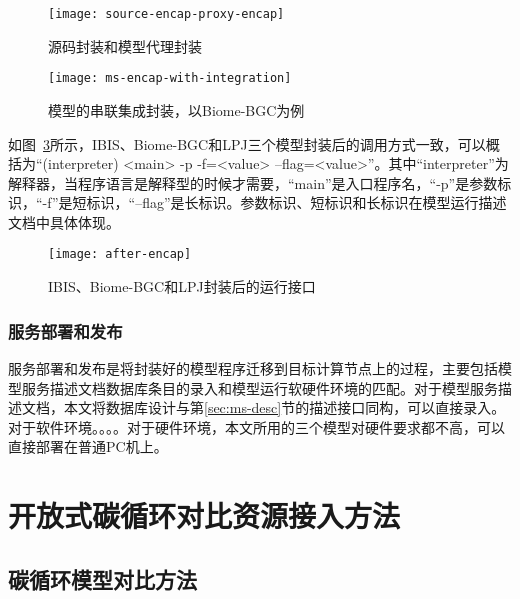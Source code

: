 \begin{figure}[!htbp]
    \centering
    \texttt{[image: source-encap-proxy-encap]}
    \caption{源码封装和模型代理封装}
    \label{fig:source-encap-proxy-encap}
\end{figure}

\begin{figure}[!htbp]
    \centering
    \texttt{[image: ms-encap-with-integration]}
    \caption{模型的串联集成封装，以Biome-BGC为例}
    \label{fig:ms-encap-with-integration}
\end{figure}

如图~\ref{fig:after-encap}所示，IBIS、Biome-BGC和LPJ三个模型封装后的调用方式一致，可以概括为“(interpreter) <main> -p -f=<value> --flag=<value>”。其中“interpreter”为解释器，当程序语言是解释型的时候才需要，“main”是入口程序名，“-p”是参数标识，“-f”是短标识，“--flag”是长标识。参数标识、短标识和长标识在模型运行描述文档中具体体现。

\begin{figure}[!htbp]
    \centering
    \texttt{[image: after-encap]}
    \caption{IBIS、Biome-BGC和LPJ封装后的运行接口}
    \label{fig:after-encap}
\end{figure}


\subsubsection{服务部署和发布}
服务部署和发布是将封装好的模型程序迁移到目标计算节点上的过程，主要包括模型服务描述文档数据库条目的录入和模型运行软硬件环境的匹配。对于模型服务描述文档，本文将数据库设计与第\ref{sec:ms-desc}节的描述接口同构，可以直接录入。对于软件环境。。。。对于硬件环境，本文所用的三个模型对硬件要求都不高，可以直接部署在普通PC机上。

\section{开放式碳循环对比资源接入方法}

\subsection{碳循环模型对比方法}
